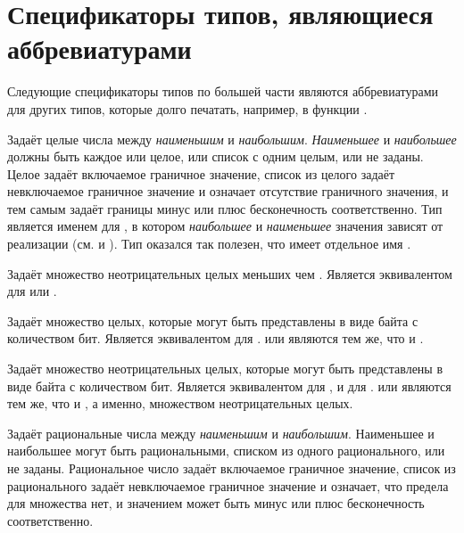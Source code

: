 \section{Спецификаторы типов, являющиеся аббревиатурами}

Следующие спецификаторы типов по большей части являются аббревиатурами для других
типов, которые долго печатать, например, в функции .
\begin{flushdesc}

\item[\cd{(integer \emph{наименьшее} \emph{наибольшее})}]
  Задаёт целые числа между \emph{наименьшим} и
  \emph{наибольшим}. \emph{Наименьшее} и \emph{наибольшее} должны быть
  каждое или целое, или список с одним целым, или не заданы.
  Целое задаёт включаемое граничное значение, список из целого задаёт невключаемое
  граничное значение и \cdf{*} означает отсутствие граничного значения, и тем самым
  задаёт границы минус или плюс бесконечность соответственно.
  Тип  является именем для , в котором \emph{наибольшее} и \emph{наименьшее}
  значения зависят от реализации (см.  и
  ).
  Тип  оказался так полезен, что имеет отдельное имя .

\item[\cd{(mod \emph{n})}]
  Задаёт множество неотрицательных целых меньших чем . Является эквивалентом
  для  или .

\item[\cd{(signed-byte \emph{s})}]
  Задаёт множество целых, которые могут быть представлены в виде байта с 
  количеством бит. Является эквивалентом для .
   или  являются тем же, что и .

\item[\cd{(unsigned-byte \emph{s})}]
  Задаёт множество неотрицательных целых, которые могут быть представлены в виде байта с 
  количеством бит. Является эквивалентом для , и для .
   или  являются тем же, что и
  , а именно, множеством неотрицательных целых.

\item[\cd{(rational \emph{наименьшее} \emph{наибольшее})}]
  Задаёт рациональные числа между \emph{наименьшим} и
  \emph{наибольшим}. Наименьшее и наибольшее могут быть рациональными, списком
  из одного рационального, или не заданы.
  Рациональное число задаёт включаемое граничное значение, список из
  рационального задаёт невключаемое граничное значение и \cdf{*} означает, что
  предела для множества нет, и значением может быть минус или плюс бесконечность соответственно.


\end{flushdesc}
